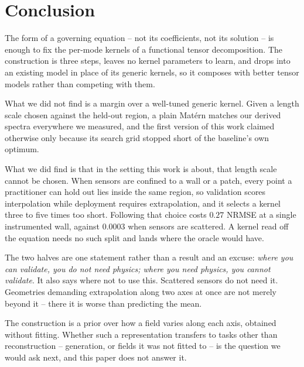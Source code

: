 \section{Conclusion}
\label{sec:conclusion}

The form of a governing equation -- not its coefficients, not its solution -- is
enough to fix the per-mode kernels of a functional tensor decomposition.  The
construction is three steps, leaves no kernel parameters to learn, and drops into
an existing model in place of its generic kernels, so it composes with better
tensor models rather than competing with them.

What we did not find is a margin over a well-tuned generic kernel.  Given a
length scale chosen against the held-out region, a plain Mat\'ern matches our
derived spectra everywhere we measured, and the first version of this work
claimed otherwise only because its search grid stopped short of the baseline's
own optimum.

What we did find is that in the setting this work is about, that length scale
cannot be chosen.  When sensors are confined to a wall or a patch, every point a
practitioner can hold out lies inside the same region, so validation scores
interpolation while deployment requires extrapolation, and it selects a kernel
three to five times too short.  Following that choice costs $0.27$ NRMSE at a
single instrumented wall, against $0.0003$ when sensors are scattered.  A kernel
read off the equation needs no such split and lands where the oracle would have.

The two halves are one statement rather than a result and an excuse: \emph{where
you can validate, you do not need physics; where you need physics, you cannot
validate}.  It also says where not to use this.  Scattered sensors do not need
it.  Geometries demanding extrapolation along two axes at once are not merely
beyond it -- there it is worse than predicting the mean.

The construction is a prior over how a field varies along each axis, obtained
without fitting.  Whether such a representation transfers to tasks other than
reconstruction -- generation, or fields it was not fitted to -- is the question
we would ask next, and this paper does not answer it.
